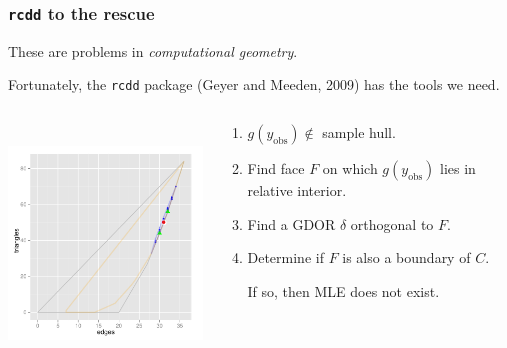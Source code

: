 \documentclass[ 10pt]{beamer}
\newcommand{\yobs}{y_{\text{obs}}}
\begin{document}
\frame
{

\frametitle{\texttt{rcdd} to the rescue}  
These are problems in \emph{computational geometry}.  

Fortunately, the \texttt{rcdd} package (Geyer and Meeden, 2009) has the 
tools we need.
\begin{columns}[T]
\begin{column}[T]{0.25\textwidth}
\includegraphics[height=2.5in,trim=3.5in 2in 0.15in 0.05in,clip=true]{MCsample-77face} %
\end{column}
\begin{column}[T]{0.75\textwidth}

\begin{enumerate}
\item $g(\yobs) \notin$ sample hull.  

\item Find face $F$ on which $g(\yobs)$ lies in relative interior.  

\item Find a GDOR $\delta$ orthogonal to $F$.  

\item Determine if $F$ is also a boundary of $C$.  

If so, then MLE does not exist.


\end{enumerate}
\end{column}
\end{columns}
}
\end{document}
